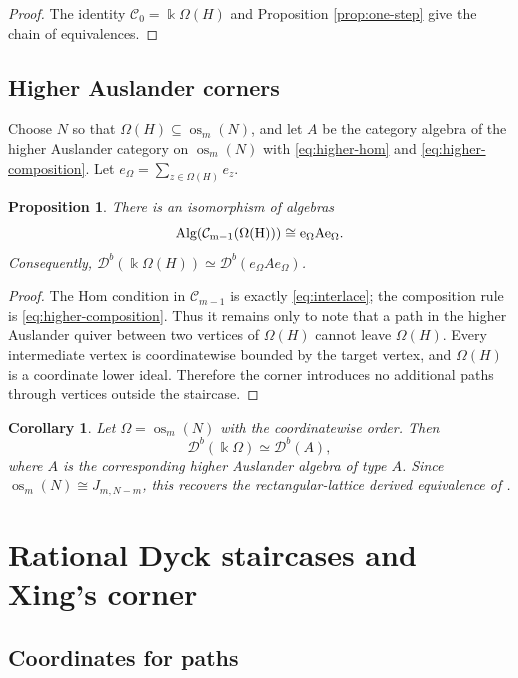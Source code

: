 \documentclass[12pt,a4paper,english,reqno]{amsart}
\theoremstyle{plain}
\newtheorem{proposition}[theorem]{Proposition}
\newtheorem{corollary}[theorem]{Corollary}
\theoremstyle{definition}
\newcommand{\kk}{\Bbbk}
\newcommand{\C}{\mathcal C}
\newcommand{\os}{\operatorname{os}}
\newcommand{\Db}[1]{{\mathscr D}^b(#1)}
\newcommand{\Alg}{\rm Alg}
\begin{document}
\begin{proof}
The identity $\C_0=\kk\Omega(H)$ and
Proposition \ref{prop:one-step} give the chain of equivalences.
\end{proof}

\subsection{Higher Auslander corners}

Choose $N$ so that $\Omega(H)\subseteq\os_m(N)$, and let $A$ be the
category algebra of the higher Auslander category on $\os_m(N)$ with
\eqref{eq:higher-hom} and \eqref{eq:higher-composition}.  Let $e_{\Omega}=\sum_{z\in\Omega(H)}e_z$.

\begin{proposition}
\label{prop:corner}
There is an isomorphism of algebras
\[
 \Alg(\C_{m-1}(\Omega(H)))
 \cong e_{\Omega}Ae_{\Omega}.
\]
Consequently, $\Db{\kk\Omega(H)}\simeq\Db{e_{\Omega}Ae_{\Omega}}$.
\end{proposition}

\begin{proof}
The Hom condition in $\C_{m-1}$ is exactly
\eqref{eq:interlace}; the composition rule is
\eqref{eq:higher-composition}.  Thus it remains only to note that a path in
the higher Auslander quiver between two vertices of $\Omega(H)$ cannot
leave $\Omega(H)$.  Every intermediate vertex is coordinatewise bounded by
the target vertex, and $\Omega(H)$ is a coordinate lower ideal.  Therefore
the corner introduces no additional paths through vertices outside the
staircase.
\end{proof}

\begin{corollary}
\label{cor:rectangular-lattice}
Let $\Omega=\os_m(N)$ with the coordinatewise order.  Then
\[
 \Db{\kk\Omega}\simeq\Db{A},
\]
where $A$ is the corresponding higher Auslander algebra of type $A$.
Since $\os_m(N)\cong J_{m,N-m}$, this recovers the rectangular-lattice
derived equivalence of \cite[Theorem~E]{Gottesman}.
\end{corollary}


\section{Rational Dyck staircases and Xing's corner}
\label{sec:dyck}

\subsection{Coordinates for paths}
\label{subsec:dyck-coordinates}
\end{document}
